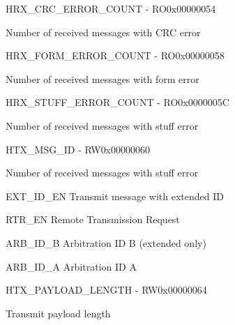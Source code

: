 \documentclass{article}
\begin{document}
\begin{register}{H}{RX{\_}CRC{\_}ERROR{\_}COUNT - RO}{0x00000054}  \par Number of received messages with CRC error \regnewline
  \label{RX_CRC_ERROR_COUNT}
\regnewline
\end{register}

\begin{register}{H}{RX{\_}FORM{\_}ERROR{\_}COUNT - RO}{0x00000058}  \par Number of received messages with form error \regnewline
  \label{RX_FORM_ERROR_COUNT}
\regnewline
\end{register}

\begin{register}{H}{RX{\_}STUFF{\_}ERROR{\_}COUNT - RO}{0x0000005C}  \par Number of received messages with stuff error \regnewline
  \label{RX_STUFF_ERROR_COUNT}
\regnewline
\end{register}

\begin{register}{H}{TX{\_}MSG{\_}ID - RW}{0x00000060}  \par Number of received messages with stuff error \regnewline
  \label{TX_MSG_ID}
\regnewline
  \begin{regdesc}\begin{reglist}[EXT{\_}ID{\_}EN]
    \item [EXT{\_}ID{\_}EN] Transmit message with extended ID    \item [RTR{\_}EN] Remote Transmission Request    \item [ARB{\_}ID{\_}B] Arbitration ID B (extended only)    \item [ARB{\_}ID{\_}A] Arbitration ID A  \end{reglist}\end{regdesc}
\end{register}

\begin{register}{H}{TX{\_}PAYLOAD{\_}LENGTH - RW}{0x00000064}  \par Transmit payload length \regnewline
  \label{TX_PAYLOAD_LENGTH}
\regnewline
\end{register}
\end{document}
